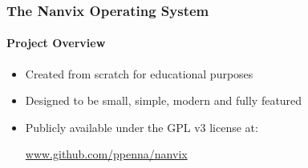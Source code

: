 \documentclass{beamer}
\begin{document}
		\begin{frame}
		\frametitle{The Nanvix Operating System}
		\framesubtitle{Project Overview}
			\begin{itemize}
			\setlength\itemsep{0.5em}
				\item Created from scratch for educational purposes
				
				\item Designed to be small, simple, modern and fully featured
				
				\item Publicly available under the GPL v3 license at:
					\\[1em]
					\begin{center}
						\url{www.github.com/ppenna/nanvix}
					\end{center}
			\end{itemize}


\end{frame}
\end{document}
